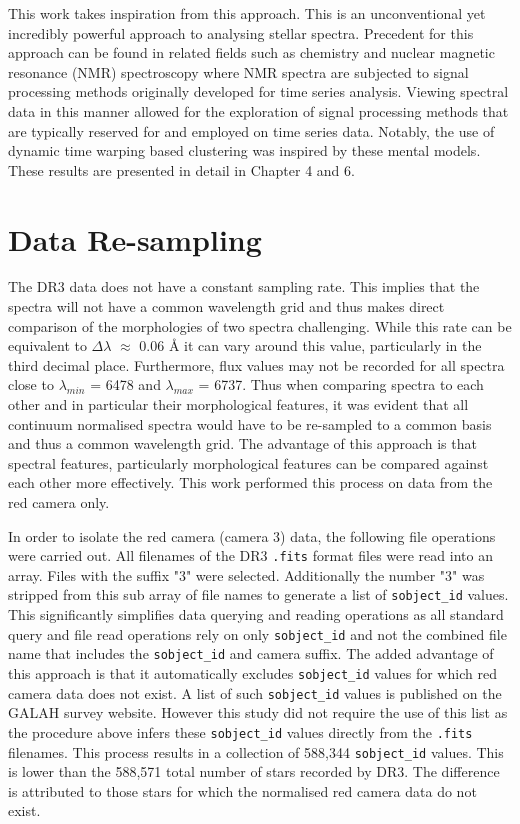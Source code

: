 This work takes inspiration from this approach. This is an unconventional yet incredibly powerful approach to analysing stellar spectra. Precedent for this approach can be found in related fields such as chemistry and nuclear magnetic resonance (NMR) spectroscopy where NMR spectra are subjected to signal processing methods originally developed for time series analysis\cite{nielsen2019practical}. Viewing spectral data in this manner allowed for the exploration of signal processing methods that are typically reserved for and employed on time series data. Notably, the use of dynamic time warping based clustering was inspired by these mental models. These results are presented in detail in Chapter 4 and 6.

\section{Data Re-sampling}

The DR3 data does not have a constant sampling rate. This implies that the spectra will not have a common wavelength grid and thus makes direct comparison of the morphologies of two spectra challenging. While this rate can be equivalent to $\Delta\lambda$ $\approx$ 0.06 \r{A}\cite{vcotar2021galah} it can vary around this value, particularly in the third decimal place. Furthermore, flux values may not be recorded for all spectra close to $\lambda_{min}$ = 6478 and $\lambda_{max}$ = 6737. Thus when comparing spectra to each other and in particular their morphological features, it was evident that all continuum normalised spectra would have to be re-sampled to a common basis and thus a common wavelength grid. The advantage of this approach is that spectral features, particularly morphological features can be compared against each other more effectively. This work performed this process on data from the red camera only. 

In order to isolate the red camera (camera 3) data, the following file operations were carried out. All filenames of the DR3 \texttt{.fits} format files were read into an array. Files with the suffix "3" were selected. Additionally the number "3" was stripped from this sub array of file names to generate a list of \texttt{sobject\_id} values. This significantly simplifies data querying and reading operations as all standard query and file read operations rely on only \texttt{sobject\_id} and not the combined file name that includes the \texttt{sobject\_id} and camera suffix. The added advantage of this approach is that it automatically excludes \texttt{sobject\_id} values for which red camera data does not exist. A list of such \texttt{sobject\_id} values is published on the GALAH survey website. However this study did not require the use of this list as the procedure above infers these \texttt{sobject\_id} values directly from the \texttt{.fits} filenames. This process results in a collection of 588,344 \texttt{sobject\_id} values. This is lower than the 588,571 total number of stars recorded by DR3. The difference is attributed to those stars for which the normalised red camera data do not exist. 

